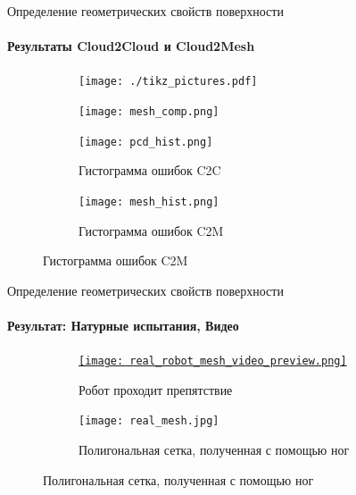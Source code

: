 \begin{frame}[t]{Определение геометрических свойств поверхности}
    \framesubtitle{Результаты Cloud2Cloud и Cloud2Mesh}
    \begin{figure}[H]
        \begin{subfigure}[t]{0.49\textwidth}
            \centering\texttt{[image: ./tikz\_pictures.pdf]}
        \end{subfigure}
        \begin{subfigure}[t]{0.49\textwidth}
            \centering\texttt{[image: mesh\_comp.png]}
        \end{subfigure}

        \begin{subfigure}[t]{0.49\textwidth}
            \centering\texttt{[image: pcd\_hist.png]}
            \caption*{Гистограмма ошибок C2C}
        \end{subfigure}
        \begin{subfigure}[t]{0.49\textwidth}
            \centering\texttt{[image: mesh\_hist.png]}
            \caption*{Гистограмма ошибок C2M}
        \end{subfigure}
    \end{figure}
\end{frame}

\begin{frame}[t]{Определение геометрических свойств поверхности}
    \framesubtitle{Результат: Натурные испытания, Видео}
    \vspace{-0.5cm}
    \begin{figure}[H]
        \begin{subfigure}[t]{0.49\textwidth}
            \href{https://youtu.be/2dxHHTG4psQ}{
                \centering\texttt{[image: real\_robot\_mesh\_video\_preview.png]}}
            \caption*{Робот проходит препятствие}
        \end{subfigure}
        \begin{subfigure}[t]{0.49\textwidth}
            \centering\texttt{[image: real\_mesh.jpg]}
            \caption*{Полигональная сетка, полученная с помощью ног}
        \end{subfigure}
    \end{figure}
\end{frame}